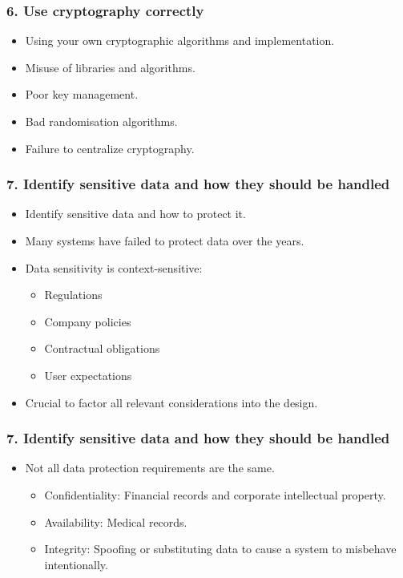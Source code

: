 \documentclass[12pt,norsk]{beamer}
\begin{document}
\begin{frame}

	\frametitle{6. Use cryptography correctly}
	
	\begin{itemize}
		
		\item Using your own cryptographic algorithms and implementation.
		\item Misuse of libraries and algorithms.
		\item Poor key management.
		\item Bad randomisation algorithms.
		\item Failure to centralize cryptography.
	\end{itemize}
\end{frame}

\begin{frame}

	\frametitle{7. Identify sensitive data and how they should be handled}
	\begin{itemize}
		\item Identify sensitive data and how to protect it.
		\item Many systems have failed to protect data over the years.
		\item Data sensitivity is context-sensitive:
		\begin{itemize}
			\item Regulations
			\item Company policies
			\item Contractual obligations
			\item User expectations
		\end{itemize}
		\item Crucial to factor all relevant considerations into the design.
		
	\end{itemize}
	

\end{frame}

\begin{frame}

	\frametitle{7. Identify sensitive data and how they should be handled}
	\begin{itemize}

		\item Not all data protection requirements are the same.
		\begin{itemize}
			\item Confidentiality: Financial records and corporate intellectual property.
			\item Availability: Medical records.
			\item Integrity: Spoofing or substituting data to cause a system to misbehave intentionally.
		\end{itemize}
		
		
	\end{itemize}
	

\end{frame}
\end{document}
